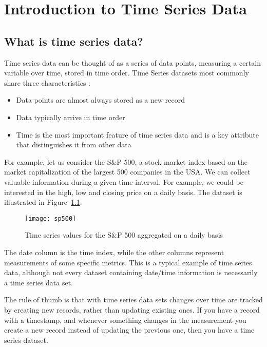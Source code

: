 


\chapter{Introduction to Time Series Data}

\section{What is time series data?}
Time series data can be thought of as a series of data points, measuring a certain variable
over time, stored in time order. Time Series datasets most commonly share three
characteristics \cite{AjayKulkarni2018What} :
\begin{itemize}
	\item Data points are almost always stored as a new record
	\item Data typically arrive in time order
	\item Time is the most important feature of time series data and is a key attribute that distinguishes it from other data
\end{itemize}

For example, let us consider the S\&P 500, a stock market index based on the market
capitalization of the largest 500 companies in the USA. We can collect valuable information
during a given time interval. For example, we could be interested in the high, low and closing
price on a daily basis. The dataset is illustrated in Figure~\ref{sp500}.

\begin{figure}
\begin{center}
\texttt{[image: sp500]}
\caption[sp500]{Time series values for the S\&P 500 aggregated on a daily basis}
\label{sp500}
\end{center}
\end{figure}

The date column is the time index, while the other columns represent measurements of some
specific metrics. This is a typical example of time series data, although not every dataset
containing date/time information is necessarily a time series data set.

The rule of thumb is that with time series data sets changes over time are tracked by creating
new records, rather than updating existing ones. If you have a record with a timestamp, and
whenever something changes in the measurement you create a new record instead of updating the
previous one, then you have a time series dataset.


